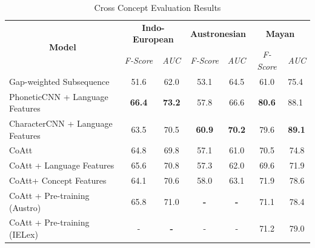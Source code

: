 \documentclass[11pt,letterpaper]{article}
\begin{document}
\begin{table}[t]
\centering
\begin{tabular}{lcccccc}
\multicolumn{1}{c}{\multirow{2}{*}{\textbf{Model}}} & \multicolumn{2}{c}{\textbf{Indo-European}} & \multicolumn{2}{c}{\textbf{Austronesian}} & \multicolumn{2}{c}{\textbf{Mayan}}                   \\ \cline{2-7} 
\multicolumn{1}{c}{}                                & \textit{F-Score}      & \textit{AUC}       & \textit{F-Score}      & \textit{AUC}      & \textit{F-Score} & \multicolumn{1}{l}{\textit{AUC}}  \\ \hline
Gap-weighted Subsequence                            & 51.6                  & 62.0               & 53.1                  & 64.5              & 61.0             & \multicolumn{1}{l}{75.4}          \\ \hline
PhoneticCNN + Language Features                     & \textbf{66.4}         & \textbf{73.2}      & 57.8                  & 66.6              & \textbf{80.6}    & \multicolumn{1}{l}{88.1}          \\
CharacterCNN + Language Features                    & 63.5                  & 70.5               & \textbf{60.9}         & \textbf{70.2}     & 79.6             & \multicolumn{1}{l}{\textbf{89.1}} \\ \hline
CoAtt                                               & 64.8                  & 69.8               & 57.1                  & 61.0              & 70.5             & 74.8                              \\
CoAtt + Language Features                           & 65.6                  & 70.8               & 57.3                  & 62.0              & 69.6             & 71.9                              \\
CoAtt+ Concept Features                             & 64.1                  & 70.6               & 58.0                  & 63.1              & 71.9             & 78.6                              \\
CoAtt + Pre-training (Austro)                       & 65.8                  & 71.0               & \textbf{-}            & \textbf{-}        & 71.1             & 78.4                              \\
CoAtt + Pre-training (IELex)                        & -                     & \textbf{-}         & -                     & -                 & 71.2             & 79.0                             
\end{tabular}
\label{CC_res}
\caption{Cross Concept Evaluation Results}
\end{table}
\end{document}
